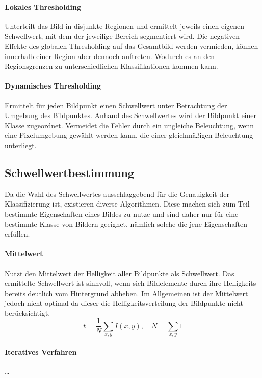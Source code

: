 \paragraph{Lokales Thresholding}
Unterteilt das Bild in disjunkte Regionen und ermittelt jeweils einen eigenen Schwellwert, mit dem der jeweilige Bereich segmentiert wird.
Die negativen Effekte des globalen Thresholding auf das Gesamtbild werden vermieden, können innerhalb einer Region aber dennoch auftreten.
Wodurch es an den Regionsgrenzen zu unterschiedlichen Klassifikationen kommen kann.

\paragraph{Dynamisches Thresholding}
Ermittelt für jeden Bildpunkt einen Schwellwert unter Betrachtung der Umgebung des Bildpunktes.
Anhand des Schwellwertes wird der Bildpunkt einer Klasse zugeordnet.
Vermeidet die Fehler durch ein ungleiche Beleuchtung, wenn eine Pixelumgebung gewählt werden kann, die einer gleichmäßigen Beleuchtung unterliegt.

\subsection*{Schwellwertbestimmung}
Da die Wahl des Schwellwertes ausschlaggebend für die Genauigkeit der Klassifizierung ist, existieren diverse Algorithmen.
Diese machen sich zum Teil bestimmte Eigenschaften eines Bildes zu nutze und sind daher nur für eine bestimmte Klasse von Bildern geeignet, nämlich solche die jene Eigenschaften erfüllen.

\paragraph{Mittelwert}
Nutzt den Mittelwert der Helligkeit aller Bildpunkte als Schwellwert.
Das ermittelte Schwellwert ist sinnvoll, wenn sich Bildelemente durch ihre Helligkeits bereits deutlich vom Hintergrund abheben.
Im Allgemeinen ist der Mittelwert jedoch nicht optimal da dieser die Helligkeitsverteilung der Bildpunkte nicht berücksichtigt.
  \[ t = \frac{1}{N} \sum_{x,y} I(x,y), \quad N = \sum_{x,y} 1 \]

\paragraph{Iteratives Verfahren}
\ldots

